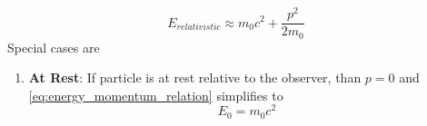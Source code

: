 \documentclass[11pt, a4paper]{article}
\begin{document}
	\begin{equation*}
		E_{relativistic} \approx m_{0}c^{2} + \frac{p^{2}}{2m_{0}}
	\end{equation*}
	Special cases are
	\begin{enumerate}
		\item \textbf{At Rest}: If particle is at rest relative to the observer, than $p=0$ and \eqref{eq:energy_momentum_relation} simplifies to 
		\begin{equation*}
			E_{0} = m_{0}c^{2} \tag{mass-energy equivalence}
		\end{equation*}
		
		

\end{enumerate}
\end{document}
